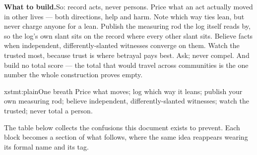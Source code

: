 \documentclass[../main_explainer]{subfiles}
\begin{document}
\textbf{What to build.}\enspace So: record acts, never persons. Price what an act
actually moved in other lives --- both directions, help and harm. Note which way ties
lean, but never charge anyone for a lean. Publish the measuring rod the log itself reads
by, so the log's own slant sits on the record where every other slant sits. Believe
facts when independent, differently-slanted witnesses converge on them. Watch the
trusted most, because trust is where betrayal pays best. Ask; never compel. And build no
total score --- the total that would travel across communities is the one number the
whole construction proves empty.

\begin{statement}{xstmt:plain}{One breath}
  Price what moves; log which way it leans; publish your own measuring rod; believe
  independent, differently-slanted witnesses; watch the trusted; never total a person.
\end{statement}

The table below collects the confusions this document exists to prevent. Each block
becomes a section of what follows, where the same idea reappears wearing its formal name
and its tag.
\end{document}
